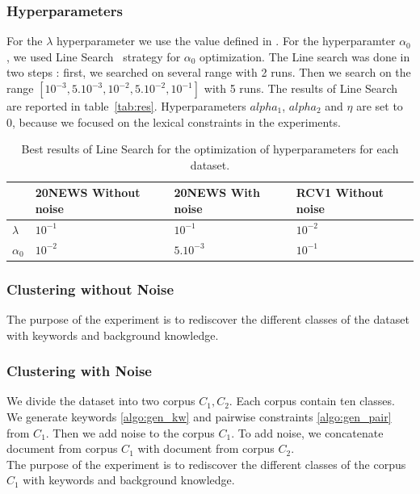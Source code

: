 \subsubsection{Hyperparameters}
For the $\lambda$ hyperparameter we use the value defined in \cite{Deap-K-Means}. 
For the hyperparamter $\alpha_0$, we used Line Search~\cite{SWANN1969S39} strategy for 
$\alpha_0$ optimization. The Line search was done in two steps :
first, we searched on several range with 2 runs. Then we search on the range 
$[10^{-3},5.10^{-3},10^{-2},5.10^{-2},10^{-1}]$ with 5 runs.   
The results of Line Search are reported 
in table~\ref{tab:res}. Hyperparameters $alpha_1$, $alpha_2$ and $\eta$ 
are set to 0, because we focused on the lexical constraints in the experiments. 
\begin{table}[!h]
\centering
  \begin{tabular}{| l | l | l | l |}
    \hline
               & 20NEWS Without noise & 20NEWS With noise & RCV1 Without noise 
\\ \hline
    $\lambda$  & $10^{-1}$            & $10^{-1}$         & $10^{-2}$           
\\ \hline
    $\alpha_0$ & $10^{-2}$            & $5.10^{-3}$       & $10^{-1}$           
\\ \hline
  \end{tabular}
  \caption{\label{tab2}Best results of Line Search for the optimization of
hyperparameters for each dataset.}
\end{table}
\subsubsection{\label{section:test1}Clustering without Noise}
The purpose of the experiment is to rediscover the different classes of the
dataset with keywords and background knowledge.

\subsubsection{\label{section:test2}Clustering with Noise}
We divide the dataset into two corpus $C_1, C_2$. Each corpus contain
ten classes. We generate keywords \ref{algo:gen_kw} and pairwise
constraints \ref{algo:gen_pair} from $C_1$. Then we add noise to the corpus
$C_1$. To add noise, we concatenate document from corpus $C_1$ with document
from corpus $C_2$.
\\The purpose of the experiment is to rediscover the different classes of the
corpus $C_1$ with keywords and background knowledge.

